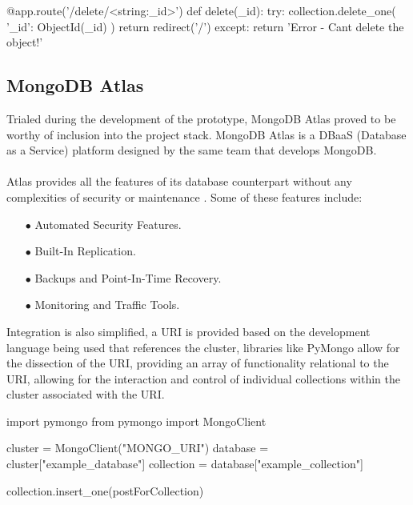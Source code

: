 \begin{python}[caption=Sample Route Definition with Flask]
@app.route('/delete/<string:_id>')
def delete(_id):
    try: 
        collection.delete_one( {'_id': ObjectId(_id) } ) 
        return redirect('/')
    except:
        return 'Error - Cant delete the object!'
\end{python}

\subsection{MongoDB Atlas}
Trialed during the development of the prototype, MongoDB Atlas proved to be worthy of inclusion into the project stack. MongoDB Atlas is a DBaaS (Database as a Service) platform designed by the same team that develops MongoDB. 

\paragraph{}
Atlas provides all the features of its database counterpart without any complexities of security or maintenance \cite{MONGO_ATLAS}. Some of these features include:

\begin{enumerate}
    \item[$\bullet$] Automated Security Features.
    \item[$\bullet$] Built-In Replication.
    \item[$\bullet$] Backups and Point-In-Time Recovery.
    \item[$\bullet$] Monitoring and Traffic Tools.
\end{enumerate}

Integration is also simplified, a URI is provided based on the development language being used that references the cluster, libraries like PyMongo allow for the dissection of the URI, providing an array of functionality relational to the URI, allowing for the interaction and control of individual collections within the cluster associated with the URI.\newline

\begin{python}[caption=Defining and Accessing a Mongo Collection with Python]
import pymongo
from pymongo import MongoClient

cluster = MongoClient("MONGO_URI")
database = cluster["example_database"]
collection = database["example_collection"]

collection.insert_one(postForCollection)
\end{python}

